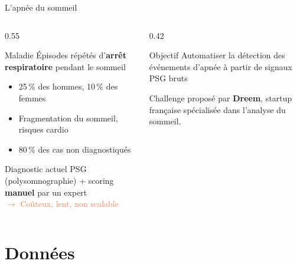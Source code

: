 \documentclass[aspectratio=169, 10pt]{beamer}
\begin{document}
\begin{frame}{L'apnée du sommeil}
    \begin{columns}[T]
        \begin{column}{0.55\textwidth}
            \begin{block}{Maladie}
                \small Épisodes répétés d'\textbf{arrêt respiratoire} pendant le sommeil
                \begin{itemize}\setlength\itemsep{1pt}
                    \item 25\,\% des hommes, 10\,\% des femmes
                    \item Fragmentation du sommeil, risques cardio
                    \item \alert{80\,\% des cas non diagnostiqués}
                \end{itemize}
            \end{block}
            \vspace{0.2cm}
            \begin{block}{Diagnostic actuel}
                \small PSG (polysomnographie) + scoring \textbf{manuel} par un expert\\
                \textcolor{Coral}{$\rightarrow$ Coûteux, lent, non scalable}
            \end{block}
        \end{column}
        \begin{column}{0.42\textwidth}
            \begin{alertblock}{Objectif}
                \small\centering
                Automatiser la détection des événements d'apnée à partir de signaux PSG bruts
            \end{alertblock}
            \vspace{0.25cm}
            \small\textcolor{MidGray}{Challenge proposé par \textbf{Dreem}, startup française spécialisée dans l'analyse du sommeil.}
        \end{column}
    \end{columns}
\end{frame}

\section{Données}
\end{document}
